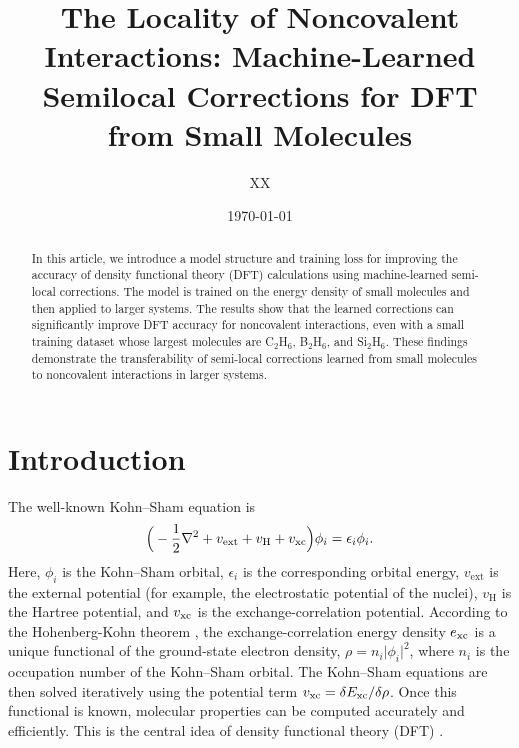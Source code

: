 \documentclass[%
twocolumn,
amsmath,
amssymb,
groupedaddress,
reprint,%
]{revtex4-2}
\begin{document}
\title{
  The Locality of Noncovalent Interactions: Machine-Learned Semilocal Corrections for DFT from Small Molecules
}
\author{XX}

\date{\today}

\begin{abstract}
  {
    In this article, we introduce a model structure and training loss for improving the accuracy of density functional theory (DFT) calculations using machine-learned semi-local corrections.
    The model is trained on the energy density of small molecules and then applied to larger systems.
    The results show that the learned corrections can significantly improve DFT accuracy for noncovalent interactions, even with a small training dataset whose largest molecules are C$_{2}$H$_{6}$, B$_{2}$H$_{6}$, and Si$_{2}$H$_{6}$.
    These findings demonstrate the transferability of semi-local corrections learned from small molecules to noncovalent interactions in larger systems.
  }
\end{abstract}

\maketitle

\section{Introduction}
The well-known Kohn--Sham equation \cite{kohnSelfConsistentEquationsIncluding1965-11-15} is
\begin{align}
  \label{eq:KS}
  \Big( - \frac{1}{2} \nabla^{2} + v_{\mathrm{ext}} + v_{\mathrm{H}} + v_{\rm{xc}}\Big) \phi_{i} = \epsilon_{i} \phi_{i}.
\end{align}
% 
Here, $\phi_{i}$ is the Kohn--Sham orbital, $\epsilon_{i}$ is the corresponding orbital energy, $v_{\mathrm{ext}}$ is the external potential (for example, the electrostatic potential of the nuclei), $v_{\mathrm{H}}$ is the Hartree potential, and $v_{\rm{xc}}$ is the exchange-correlation potential.
% 
According to the Hohenberg-Kohn theorem \cite{hohenbergInhomogeneousElectronGas1964-11-09}, the exchange-correlation energy density $e_{\rm{xc}}$ is a unique functional of the ground-state electron density, $\rho = n_{i} \vert \phi_{i} \vert^{2}$, where $n_{i}$ is the occupation number of the Kohn--Sham orbital.
%
The Kohn--Sham equations are then solved iteratively using the potential term $v_{\rm{xc}} = \delta E_{\rm{xc}} / \delta \rho$.
% 
Once this functional is known, molecular properties can be computed accurately and efficiently.
%
This is the central idea of density functional theory (DFT) \cite{parrDensityFunctionalTheory1980}.
\end{document}
